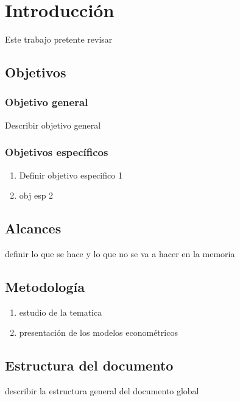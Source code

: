 
\chapter{Introducción}
\label{c1} %

Este trabajo pretente revisar 

\section{Objetivos}
\subsection{Objetivo general}

Describir objetivo general


\subsection{Objetivos específicos}


\begin{enumerate}
\item Definir objetivo especifico 1
\item obj esp 2
\end{enumerate}


\section{Alcances}

definir lo que se hace y lo que no se va a hacer en la memoria

\section{Metodología}


\begin{enumerate}
\item estudio de la tematica
\item presentación de los modelos econométricos

\end{enumerate}

\newpage
\section{Estructura del documento}

describir la estructura general del documento global



